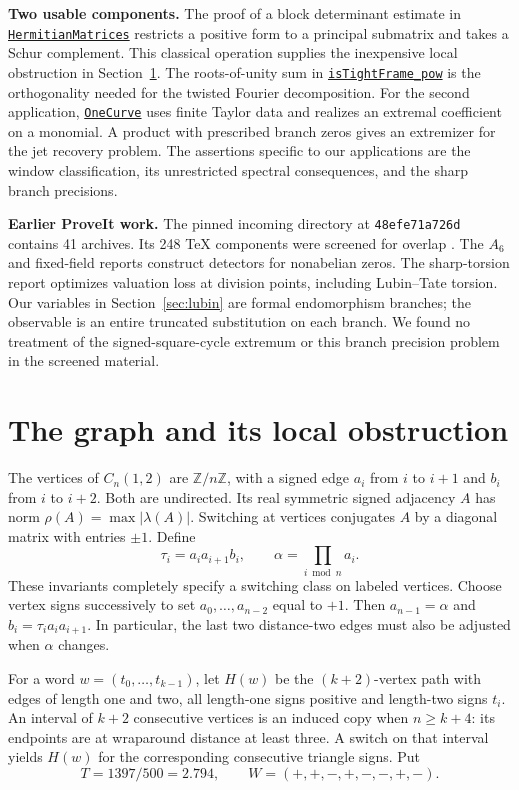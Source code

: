 \documentclass[11pt,letterpaper]{article}
\newcommand{\ZZ}{\mathbb Z}\newcommand{\eps}{\varepsilon}
\newcommand{\src}[2]{\href{https://github.com/lsernau/grh-lean/blob/72fead102f663d5c7a407964a13dc0cf9d977207/grh/src/#1}{#2}}
\newcommand{\code}[1]{{\small\texttt{#1}}}
\begin{document}
\textbf{Two usable components.}
The proof of a block determinant estimate in \src{Lib/General/LinearAlgebra/HermitianMatrices.lean\#L50}{\code{HermitianMatrices}} restricts a positive form to a principal submatrix and takes a Schur complement. This classical operation supplies the inexpensive local obstruction in Section~\ref{sec:windows}. The roots-of-unity sum in \src{New/Derivatives/Vacuum/TightFrames.lean\#L388}{\code{isTightFrame\_pow}} is the orthogonality needed for the twisted Fourier decomposition. For the second application, \src{New/Derivatives/Sharpness/OneCurve.lean\#L45}{\code{OneCurve}} uses finite Taylor data and realizes an extremal coefficient on a monomial. A product with prescribed branch zeros gives an extremizer for the jet recovery problem. The assertions specific to our applications are the window classification, its unrestricted spectral consequences, and the sharp branch precisions.

\textbf{Earlier ProveIt work.}
The pinned incoming directory at \texttt{48efe71a726d} contains 41 archives. Its 248 TeX components were screened for overlap \cite{Incoming}. The $A_6$ and fixed-field reports construct detectors for nonabelian zeros. The sharp-torsion report optimizes valuation loss at division points, including Lubin--Tate torsion. Our variables in Section~\ref{sec:lubin} are formal endomorphism branches; the observable is an entire truncated substitution on each branch. We found no treatment of the signed-square-cycle extremum or this branch precision problem in the screened material.

\newpage
\section{The graph and its local obstruction}\label{sec:windows}
The vertices of $C_n(1,2)$ are $\ZZ/n\ZZ$, with a signed edge $a_i$ from $i$ to $i+1$ and $b_i$ from $i$ to $i+2$. Both are undirected. Its real symmetric signed adjacency $A$ has norm $\rho(A)=\max|\lambda(A)|$. Switching at vertices conjugates $A$ by a diagonal matrix with entries $\pm1$. Define
\[
       \tau_i=a_i a_{i+1}b_i,\qquad \alpha=\prod_{i\bmod n}a_i .
\]
These invariants completely specify a switching class on labeled vertices. Choose vertex signs successively to set $a_0,\ldots,a_{n-2}$ equal to $+1$. Then $a_{n-1}=\alpha$ and $b_i=\tau_i a_i a_{i+1}$. In particular, the last two distance-two edges must also be adjusted when $\alpha$ changes.

For a word $w=(t_0,\ldots,t_{k-1})$, let $H(w)$ be the $(k+2)$-vertex path with edges of length one and two, all length-one signs positive and length-two signs $t_i$. An interval of $k+2$ consecutive vertices is an induced copy when $n\ge k+4$: its endpoints are at wraparound distance at least three. A switch on that interval yields $H(w)$ for the corresponding consecutive triangle signs.
Put
\[
      T=1397/500=2.794,\qquad W=(+,+,-,+,-,-,+,-).
\]
\end{document}

